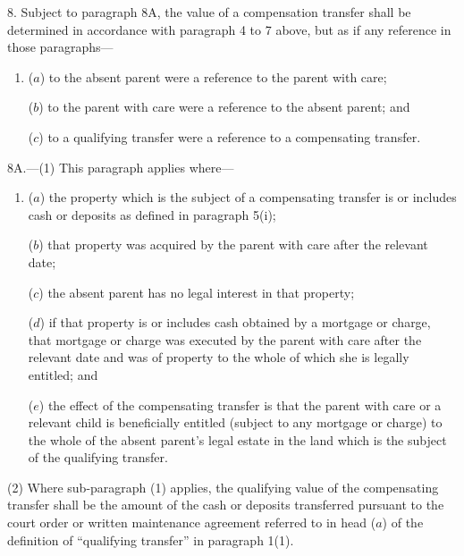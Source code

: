 \documentclass[12pt,a4paper]{article}
\begin{document}
8.  
Subject to paragraph 8A, the value of  %
a compensation transfer shall be determined in accordance with paragraph 4 to 7 above, but as if any reference in those paragraphs—
\begin{enumerate}\item[]
($a$) to the absent parent were a reference to the parent with care;

($b$) to the parent with care were a reference to the absent parent; and

($c$) to a qualifying transfer were a reference to a compensating transfer.
\end{enumerate}


\medskip

8A.—(1) This paragraph applies where—
\begin{enumerate}\item[]
($a$) the property which is the subject of a compensating transfer is or includes cash or deposits as defined in paragraph 5(i);

($b$) that property was acquired by the parent with care after the relevant date;

($c$) the absent parent has no legal interest in that property;

($d$) if that property is or includes cash obtained by a mortgage or charge, that mortgage or charge was executed by the parent with care after the relevant date and was of property to the whole of which she is legally entitled; and

($e$) the effect of the compensating transfer is that the parent with care or a relevant child is beneficially entitled (subject to any mortgage or charge) to the whole of the absent parent’s legal estate in the land which is the subject of the qualifying transfer.
\end{enumerate}

(2) Where sub-paragraph (1) applies, the qualifying value of the compensating transfer shall be the amount of the cash or deposits transferred pursuant to the court order or written maintenance agreement referred to in head ($a$) of the definition of “qualifying transfer” in paragraph 1(1).

\end{document}
